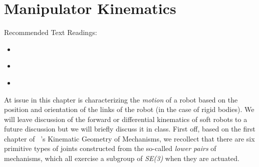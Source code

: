 \chapter{Manipulator Kinematics}  
\label{chap:manip}

 
Recommended Text Readings: 
\begin{itemize}
 \item \cite[Chapter 3]{MurrayBook}
 \item \cite{Brockett1990}
 \item \cite[Chapter 4]{LynchBook}
\end{itemize}

At issue in this chapter is characterizing the \textit{motion} of a robot based on the position and orientation of the links of the robot (in the case of rigid bodies). We will leave discussion of the forward or differential kinematics of soft robots to a future discussion but we will briefly discuss it in class. First off, based on the first chapter of ~\cite{Hunt1983}'s Kinematic Geometry of Mechanisms, we recollect that there are six primitive types of joints constructed from the so-called \textit{lower pairs} of mechanisms, which all exercise a subgroup of \textit{SE(3)} when they are actuated.


